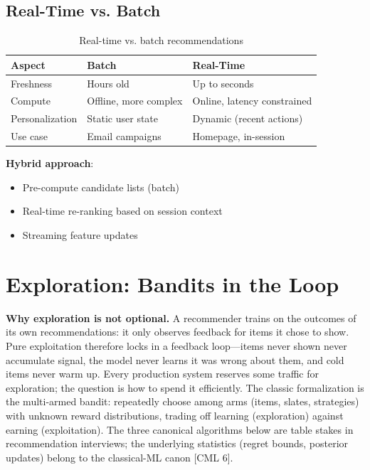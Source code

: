 \subsection{Real-Time vs. Batch}

\begin{table}[H]
\centering
\caption{Real-time vs. batch recommendations}
\begin{tabularx}{\textwidth}{lXX}
\toprule
\textbf{Aspect} & \textbf{Batch} & \textbf{Real-Time} \\
\midrule
Freshness & Hours old & Up to seconds \\
Compute & Offline, more complex & Online, latency constrained \\
Personalization & Static user state & Dynamic (recent actions) \\
Use case & Email campaigns & Homepage, in-session \\
\bottomrule
\end{tabularx}
\end{table}

\textbf{Hybrid approach}:
\begin{itemize}
    \item Pre-compute candidate lists (batch)
    \item Real-time re-ranking based on session context
    \item Streaming feature updates
\end{itemize}

\section{Exploration: Bandits in the Loop}
\label{sr:sec:exploration_bandits}

\textbf{Why exploration is not optional.} A recommender trains on the outcomes of its own recommendations: it only observes feedback for items it chose to show. Pure exploitation therefore locks in a feedback loop---items never shown never accumulate signal, the model never learns it was wrong about them, and cold items never warm up. Every production system reserves some traffic for exploration; the question is how to spend it efficiently. The classic formalization is the multi-armed bandit: repeatedly choose among arms (items, slates, strategies) with unknown reward distributions, trading off learning (exploration) against earning (exploitation). The three canonical algorithms below are table stakes in recommendation interviews; the underlying statistics (regret bounds, posterior updates) belong to the classical-ML canon [CML 6].

